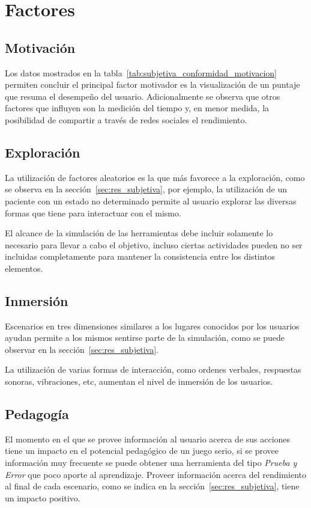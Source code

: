 \section{Factores}


\subsection{Motivación}

Los datos mostrados en la tabla~\ref{tab:subjetiva_conformidad_motivacion}
permiten concluir el principal factor motivador es la visualización de un
puntaje que resuma el desempeño del usuario. Adicionalmente se observa que otros
factores que influyen son la medición del tiempo y, en menor medida, la
posibilidad de compartir a través de redes sociales el rendimiento.

\subsection{Exploración}

La utilización de factores aleatorios es la que más favorece a la exploración,
como se observa en la sección~\ref{sec:res_subjetiva}, por ejemplo, la
utilización de un paciente con un estado no determinado permite al usuario
explorar las diversas formas que tiene para interactuar con el mismo.

El alcance de la simulación de las herramientas debe incluir solamente lo
necesario para llevar a cabo el objetivo, incluso ciertas actividades pueden no
ser incluidas completamente para mantener la consistencia entre los distintos
elementos.

\subsection{Inmersión}

Escenarios en tres dimensiones similares a los lugares conocidos por los
usuarios ayudan permite a los mismos sentirse parte de la simulación, como se
puede observar en la sección~\ref{sec:res_subjetiva}.

La utilización de varias formas de interacción, como ordenes verbales,
respuestas sonoras, vibraciones, etc, aumentan el nivel de inmersión de los
usuarios.

\subsection{Pedagogía}

El momento en el que se provee información al usuario acerca de sus acciones
tiene un impacto en el potencial pedagógico de un juego serio, si se provee
información muy frecuente se puede obtener una herramienta del tipo \emph{Prueba
    y Error} que poco aporte al aprendizaje. Proveer información acerca del
rendimiento al final de cada escenario, como se indica en la
sección~\ref{sec:res_subjetiva}, tiene un impacto positivo.


